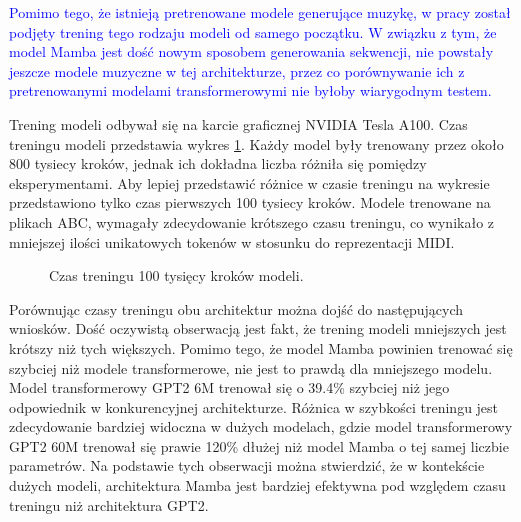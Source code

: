 \documentclass[data-science]{agh-wi} %
\begin{document}
\textcolor{blue}{Pomimo tego, że istnieją pretrenowane modele generujące muzykę, w pracy został podjęty trening tego rodzaju modeli od samego początku. W związku z tym, że model Mamba jest dość nowym sposobem generowania sekwencji, nie powstały jeszcze modele muzyczne w tej architekturze, przez co porównywanie ich z pretrenowanymi modelami transformerowymi nie byłoby wiarygodnym testem.}

Trening modeli odbywał się na karcie graficznej NVIDIA Tesla A100. Czas treningu modeli przedstawia wykres \ref*{fig:czas_treningu}. Każdy model były trenowany przez około 800 tysiecy kroków, jednak ich dokładna liczba różniła się pomiędzy eksperymentami. Aby lepiej przedstawić różnice w czasie treningu na wykresie przedstawiono tylko czas pierwszych 100 tysiecy kroków. Modele trenowane na plikach ABC, wymagały zdecydowanie krótszego czasu treningu, co wynikało z mniejszej ilości unikatowych tokenów w stosunku do reprezentacji MIDI.

\begin{figure}[ht!]
    \centering
    \caption{Czas treningu 100 tysięcy kroków modeli.}\label{fig:czas_treningu}
\end{figure}

Porównując czasy treningu obu architektur można dojść do następujących wniosków. Dość oczywistą obserwacją jest fakt, że trening modeli mniejszych jest krótszy niż tych większych. Pomimo tego, że model Mamba powinien trenować się szybciej niż modele transformerowe, nie jest to prawdą dla mniejszego modelu. Model transformerowy GPT2 6M trenował się o 39.4\% szybciej niż jego odpowiednik w konkurencyjnej architekturze. Różnica w szybkości treningu jest zdecydowanie bardziej widoczna w dużych modelach, gdzie model transformerowy GPT2 60M trenował się prawie 120\% dłużej niż model Mamba o tej samej liczbie parametrów. Na podstawie tych obserwacji można stwierdzić, że w kontekście dużych modeli, architektura Mamba jest bardziej efektywna pod względem czasu treningu niż architektura GPT2.
\end{document}
